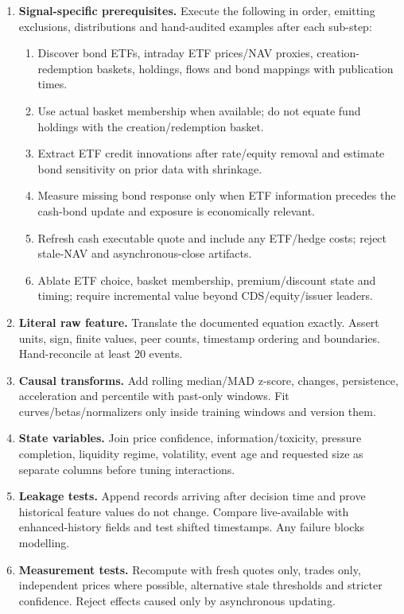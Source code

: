 \documentclass[10pt]{article}
\begin{document}
\begin{enumerate}[leftmargin=2em,label=\textbf{A\arabic*.}]
\item \textbf{Signal-specific prerequisites.} Execute the following in order, emitting exclusions, distributions and hand-audited examples after each sub-step:
\begin{enumerate}[label=\alph*)]
\item Discover bond ETFs, intraday ETF prices/NAV proxies, creation-redemption baskets, holdings, flows and bond mappings with publication times.
\item Use actual basket membership when available; do not equate fund holdings with the creation/redemption basket.
\item Extract ETF credit innovations after rate/equity removal and estimate bond sensitivity on prior data with shrinkage.
\item Measure missing bond response only when ETF information precedes the cash-bond update and exposure is economically relevant.
\item Refresh cash executable quote and include any ETF/hedge costs; reject stale-NAV and asynchronous-close artifacts.
\item Ablate ETF choice, basket membership, premium/discount state and timing; require incremental value beyond CDS/equity/issuer leaders.
\end{enumerate}
\item \textbf{Literal raw feature.} Translate the documented equation exactly. Assert units, sign, finite values, peer counts, timestamp ordering and boundaries. Hand-reconcile at least 20 events.
\item \textbf{Causal transforms.} Add rolling median/MAD z-score, changes, persistence, acceleration and percentile with past-only windows. Fit curves/betas/normalizers only inside training windows and version them.
\item \textbf{State variables.} Join price confidence, information/toxicity, pressure completion, liquidity regime, volatility, event age and requested size as separate columns before tuning interactions.
\item \textbf{Leakage tests.} Append records arriving after decision time and prove historical feature values do not change. Compare live-available with enhanced-history fields and test shifted timestamps. Any failure blocks modelling.
\item \textbf{Measurement tests.} Recompute with fresh quotes only, trades only, independent prices where possible, alternative stale thresholds and stricter confidence. Reject effects caused only by asynchronous updating.

\end{enumerate}
\end{document}
